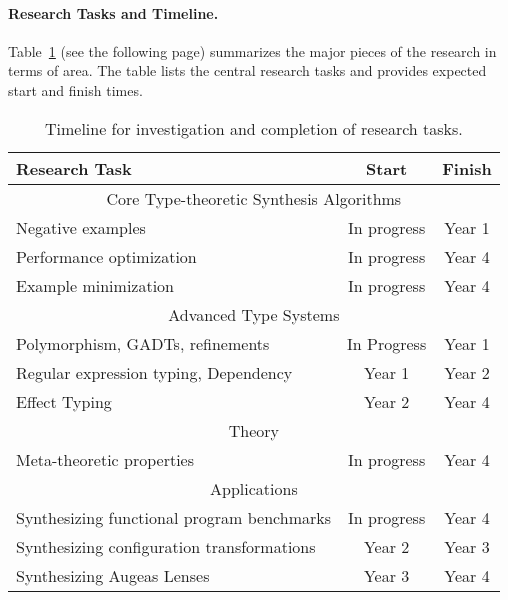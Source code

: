 \paragraph*{Research Tasks and Timeline.}
Table~\ref{fig:timeline} (see the following page)
summarizes the major pieces of the research
in terms of area.   The table lists the central research tasks and
provides expected start and finish times. 

\begin{table}[h]
\centering
\begin{tabular}{|l||c|c|}
\hline
Research Task & Start & Finish\\
\hline
\multicolumn{3}{|c|}{Core Type-theoretic Synthesis Algorithms}\\
\hline
Negative examples & In progress & Year 1 \\
Performance optimization & In progress & Year 4 \\
Example minimization & In progress & Year 4 \\
\hline
\multicolumn{3}{|c|}{Advanced Type Systems}\\
\hline
Polymorphism, GADTs, refinements & In Progress & Year 1 \\
Regular expression typing, Dependency & Year 1 & Year 2 \\
Effect Typing & Year 2 & Year 4 \\
\hline
\multicolumn{3}{|c|}{Theory}\\
\hline
Meta-theoretic properties & In progress & Year 4 \\
\hline
\multicolumn{3}{|c|}{Applications}\\
\hline
Synthesizing functional program benchmarks & In progress & Year 4 \\
Synthesizing configuration transformations & Year 2 & Year 3 \\
Synthesizing Augeas Lenses & Year 3 & Year 4 \\
\hline
\end{tabular}
\caption{Timeline for investigation and completion of research tasks.}
\label{fig:timeline}
\end{table}
